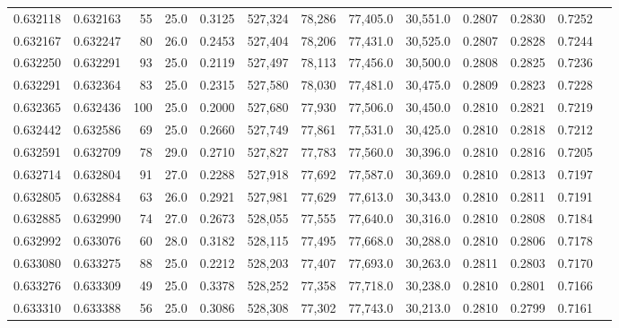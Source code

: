 \begin{tabular}{rrrrrrrrrrrrr}
0.632118 & 0.632163 &    55 & 25.0 &                                     0.3125 & 527,324 &  78,286 &  77,405.0 &  30,551.0 & 0.2807 & 0.2830 & 0.7252 \\
0.632167 & 0.632247 &    80 & 26.0 &                                     0.2453 & 527,404 &  78,206 &  77,431.0 &  30,525.0 & 0.2807 & 0.2828 & 0.7244 \\
0.632250 & 0.632291 &    93 & 25.0 &                                     0.2119 & 527,497 &  78,113 &  77,456.0 &  30,500.0 & 0.2808 & 0.2825 & 0.7236 \\
0.632291 & 0.632364 &    83 & 25.0 &                                     0.2315 & 527,580 &  78,030 &  77,481.0 &  30,475.0 & 0.2809 & 0.2823 & 0.7228 \\
0.632365 & 0.632436 &   100 & 25.0 &                                     0.2000 & 527,680 &  77,930 &  77,506.0 &  30,450.0 & 0.2810 & 0.2821 & 0.7219 \\
0.632442 & 0.632586 &    69 & 25.0 &                                     0.2660 & 527,749 &  77,861 &  77,531.0 &  30,425.0 & 0.2810 & 0.2818 & 0.7212 \\
0.632591 & 0.632709 &    78 & 29.0 &                                     0.2710 & 527,827 &  77,783 &  77,560.0 &  30,396.0 & 0.2810 & 0.2816 & 0.7205 \\
0.632714 & 0.632804 &    91 & 27.0 &                                     0.2288 & 527,918 &  77,692 &  77,587.0 &  30,369.0 & 0.2810 & 0.2813 & 0.7197 \\
0.632805 & 0.632884 &    63 & 26.0 &                                     0.2921 & 527,981 &  77,629 &  77,613.0 &  30,343.0 & 0.2810 & 0.2811 & 0.7191 \\
0.632885 & 0.632990 &    74 & 27.0 &                                     0.2673 & 528,055 &  77,555 &  77,640.0 &  30,316.0 & 0.2810 & 0.2808 & 0.7184 \\
0.632992 & 0.633076 &    60 & 28.0 &                                     0.3182 & 528,115 &  77,495 &  77,668.0 &  30,288.0 & 0.2810 & 0.2806 & 0.7178 \\
0.633080 & 0.633275 &    88 & 25.0 &                                     0.2212 & 528,203 &  77,407 &  77,693.0 &  30,263.0 & 0.2811 & 0.2803 & 0.7170 \\
0.633276 & 0.633309 &    49 & 25.0 &                                     0.3378 & 528,252 &  77,358 &  77,718.0 &  30,238.0 & 0.2810 & 0.2801 & 0.7166 \\
0.633310 & 0.633388 &    56 & 25.0 &                                     0.3086 & 528,308 &  77,302 &  77,743.0 &  30,213.0 & 0.2810 & 0.2799 & 0.7161 \\

\end{tabular}
